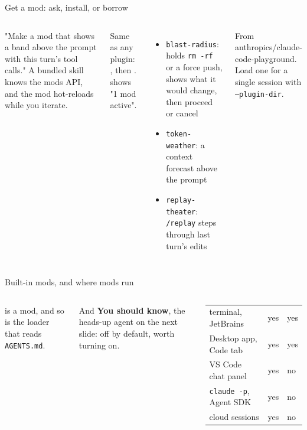 \documentclass[aspectratio=169,11pt,t]{beamer}
\begin{document}
\begin{frame}{Get a mod: ask, install, or borrow}
  \begin{columns}[T,onlytextwidth]
      \par\vspace{0.25em}\small
      "Make a mod that shows a band above the prompt with this turn's tool calls." A bundled skill knows the mods API, and the mod hot-reloads while you iterate.\par\vspace{0.5em}
      \par\vspace{0.25em}
      Same as any plugin: , then .  shows "1 mod active".
      \par\vspace{0.25em}
      \begin{itemize}\footnotesize\setlength\itemsep{0.2em}
        \item \texttt{blast-radius}: holds \texttt{rm -rf} or a force push, shows what it would change, then proceed or cancel
        \item \texttt{token-weather}: a context forecast above the prompt
        \item \texttt{replay-theater}: \texttt{/replay} steps through last turn's edits
      \end{itemize}
      {\footnotesize\color{muted}From anthropics/claude-code-playground. Load one for a single session with \texttt{--plugin-dir}.}
  \end{columns}
\end{frame}

\begin{frame}{Built-in mods, and where mods run}
  \begin{columns}[T,onlytextwidth]
      \par\vspace{0.25em}\small
       is a mod, and so is the loader that reads \texttt{AGENTS.md}.\par\vspace{0.4em}
      And \textbf{You should know}, the heads-up agent on the next slide: off by default, worth turning on.
      \footnotesize
      \begin{tabularx}{\linewidth}{@{}YL{1.1cm}L{1.1cm}@{}}
        \toprule
         &  & \\
        \midrule
        terminal, JetBrains & yes & yes\\
        Desktop app, Code tab & yes & yes\\
        VS Code chat panel & yes & no\\
        \texttt{claude -p}, Agent SDK & yes & no\\
        cloud sessions & yes & no\\
        \bottomrule
      \end{tabularx}
  \end{columns}
\end{frame}
\end{document}
